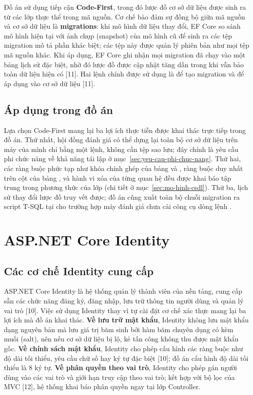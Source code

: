 Đồ án sử dụng tiếp cận \textbf{Code-First}, trong đó lược đồ cơ sở dữ liệu được
sinh ra từ các lớp thực thể trong mã nguồn. Cơ chế bảo đảm sự đồng bộ giữa mã
nguồn và cơ sở dữ liệu là \textbf{migrations}: khi mô hình dữ liệu thay đổi, EF
Core so sánh mô hình hiện tại với ảnh chụp (snapshot) của mô hình cũ để sinh ra
các tệp migration mô tả phần khác biệt; các tệp này được quản lý phiên bản như
mọi tệp mã nguồn khác. Khi áp dụng, EF Core ghi nhận mọi migration đã chạy vào
một bảng lịch sử đặc biệt, nhờ đó lược đồ được cập nhật tăng dần trong khi vẫn
bảo toàn dữ liệu hiện có [11]. Hai lệnh chính được sử dụng là  để tạo migration và  để áp
dụng vào cơ sở dữ liệu [11].

\subsection{Áp dụng trong đồ án}

Lựa chọn Code-First mang lại ba lợi ích thực tiễn được khai thác trực tiếp trong
đồ án. Thứ nhất, hội đồng đánh giá có thể dựng lại toàn bộ cơ sở dữ liệu trên
máy của mình chỉ bằng một lệnh, không cần tệp sao lưu; đây chính là yêu cầu phi
chức năng về khả năng tái lập ở mục~\ref{sec:yeu-cau-phi-chuc-nang}. Thứ hai,
các ràng buộc phức tạp như khóa chính ghép của bảng  và
, ràng buộc duy nhất trên cột  của bảng
, và hành vi xóa của từng quan hệ đều được khai báo tập trung
trong phương thức  của lớp  (chi tiết ở
mục~\ref{sec:mo-hinh-csdl}). Thứ ba, lịch sử thay đổi lược đồ truy vết được;
đồ án cũng xuất toàn bộ chuỗi migration ra script T-SQL tại
 cho trường hợp máy đánh giá chưa cài công cụ
dòng lệnh .

\section{ASP.NET Core Identity}
\label{sec:identity}

\subsection{Các cơ chế Identity cung cấp}

ASP.NET Core Identity là hệ thống quản lý thành viên của nền tảng, cung cấp sẵn
các chức năng đăng ký, đăng nhập, lưu trữ thông tin người dùng và quản lý vai trò
[10]. Việc sử dụng Identity thay vì tự cài đặt cơ chế xác thực mang lại ba lợi
ích mà đồ án khai thác. \textbf{Về lưu trữ mật khẩu}, Identity không lưu mật
khẩu dạng nguyên bản mà lưu giá trị băm sinh bởi hàm băm chuyên dụng có kèm muối
(salt), nên nếu cơ sở dữ liệu bị lộ, kẻ tấn công không thu được mật khẩu gốc.
\textbf{Về chính sách mật khẩu}, Identity cho phép cấu hình các ràng buộc như độ
dài tối thiểu, yêu cầu chữ số hay ký tự đặc biệt [10]; đồ án cấu hình độ dài tối
thiểu là 8 ký tự. \textbf{Về phân quyền theo vai trò}, Identity cho phép gán
người dùng vào các vai trò và giới hạn truy cập theo vai trò; kết hợp với bộ lọc
\code{[Authorize]} của MVC [12], hệ thống khai báo phân quyền ngay tại lớp
Controller.

